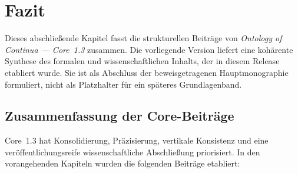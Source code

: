 
\section{Fazit}
\label{sec:conclusion}

Dieses abschließende Kapitel fasst die strukturellen Beiträge von
\emph{Ontology of Continua --- Core~1.3} zusammen.
Die vorliegende Version liefert eine kohärente Synthese des formalen und
wissenschaftlichen Inhalts, der in diesem Release etabliert wurde.
Sie ist als Abschluss der beweisgetragenen Hauptmonographie formuliert,
nicht als Platzhalter für ein späteres Grundlagenband.

\subsection{Zusammenfassung der Core-Beiträge}

Core~1.3 hat Konsolidierung, Präzisierung, vertikale Konsistenz und eine
veröffentlichungsreife wissenschaftliche Abschließung priorisiert.
In den vorangehenden Kapiteln wurden die folgenden Beiträge etabliert:

